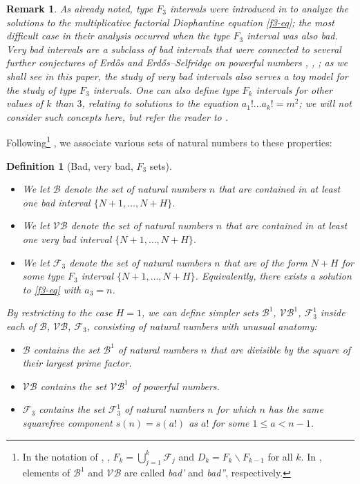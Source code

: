 \documentclass[12pt]{amsart}
\newtheorem{definition}[theorem]{Definition}
\newtheorem{remark}[theorem]{Remark}
\begin{document}
\begin{remark} As already noted, type $F_3$ intervals were introduced in \cite{erdos-graham} to analyze the solutions to the multiplicative factorial Diophantine equation \eqref{f3-eq}; the most difficult case in their analysis occurred when the type $F_3$ interval was also bad.  Very bad intervals are a subclass of bad intervals that were connected to several further conjectures of Erd\H{o}s and Erd\H{o}s--Selfridge on powerful numbers \cite{erdos76}, \cite{erdos-consecutive}, \cite{eg}; as we shall see in this paper, the study of very bad intervals also serves a toy model for the study of type $F_3$ intervals.  One can also define type $F_k$ intervals for other values of $k$ than $3$, relating to solutions to the equation $a_1! \dots a_k! = m^2$; we will not consider such concepts here, but refer the reader to \cite{erdos-graham}.
\end{remark}

Following\footnote{In the notation of \cite{erdos-graham}, \cite{eg}, $F_k = \bigcup_{j=1}^k {\mathcal F}_j$ and $D_k = F_k \backslash F_{k-1}$ for all $k$.  In \cite[p. 345]{erdos-graham}, elements of ${\mathcal B}^1$ and  $\mathcal{VB}$ are called \emph{bad'} and \emph{bad''}, respectively.} \cite{eg}, we associate various sets of natural numbers to these properties:


\begin{definition}[Bad, very bad, $F_3$ sets]\label{def-sets}\
\begin{itemize}
    \item[(i)] We let ${\mathcal B}$ denote the set of natural numbers $n$ that are contained in at least one bad interval $\{N+1,\dots,N+H\}$.
    \item[(ii)] We let $\mathcal{VB}$ denote the set of natural numbers $n$ that are contained in at least one very bad interval $\{N+1,\dots,N+H\}$.
    \item[(iii)] We let ${\mathcal F}_3$ denote the set of natural numbers $n$ that are of the form $N+H$ for some type $F_3$ interval $\{N+1,\dots,N+H\}$.  Equivalently, there exists a solution to \eqref{f3-eq} with $a_3 = n$.
\end{itemize}
By restricting to the case $H=1$, we can define simpler sets ${\mathcal B}^1$, $\mathcal{VB}^1$, ${\mathcal F}_3^1$ inside each of ${\mathcal B}$, $\mathcal{VB}$, ${\mathcal F}_3$, consisting of natural numbers with unusual anatomy:
\begin{itemize}
   \item[$(i)_1$] ${\mathcal B}$ contains the set ${\mathcal B}^1$ of natural numbers $n$ that are divisible by the square of their largest prime factor.
   \item[$(ii)_1$] $\mathcal{VB}$ contains the set $\mathcal{VB}^1$ of powerful numbers.
   \item[$(iii)_1$] ${\mathcal F}_3$ contains the set ${\mathcal F}_3^1$ of natural numbers $n$ for which $n$ has the same squarefree component $s(n)=s(a!)$ as $a!$ for some $1 \leq a < n-1$.
\end{itemize}
\end{definition}
\end{document}
